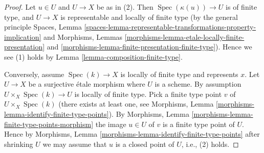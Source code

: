 \documentclass[10pt,a4paper]{amsart}
\theoremstyle{plain}
\theoremstyle{definition}
\theoremstyle{remark}
\numberwithin{equation}{subsection}
\def\Spec{\mathop{\mathrm{Spec}}}
\begin{document}
\begin{proof}
Let $u \in U$ and $U \to X$ be as in (2). Then
$\Spec(\kappa(u)) \to U$ is of finite type, and $U \to X$ is
representable and locally of finite type (by the general principle
Spaces, Lemma
\ref{spaces-lemma-representable-transformations-property-implication}
and
Morphisms, Lemmas \ref{morphisms-lemma-etale-locally-finite-presentation} and
\ref{morphisms-lemma-finite-presentation-finite-type}). Hence we see
(1) holds by
Lemma \ref{lemma-composition-finite-type}.

\medskip\noindent
Conversely, assume $\Spec(k) \to X$ is locally of finite type and
represents $x$. Let $U \to X$ be a surjective \'etale morphism where $U$
is a scheme. By assumption $U \times_X \Spec(k) \to U$ is locally
of finite type. Pick a finite type point $v$ of
$U \times_X \Spec(k)$ (there exists at least one, see
Morphisms, Lemma \ref{morphisms-lemma-identify-finite-type-points}).
By
Morphisms, Lemma \ref{morphisms-lemma-finite-type-points-morphism}
the image $u \in U$ of $v$ is a finite type point of $U$.
Hence by
Morphisms, Lemma \ref{morphisms-lemma-identify-finite-type-points}
after shrinking $U$ we may assume that $u$ is a closed point of $U$, i.e.,
(2) holds.
\end{proof}
\end{document}
